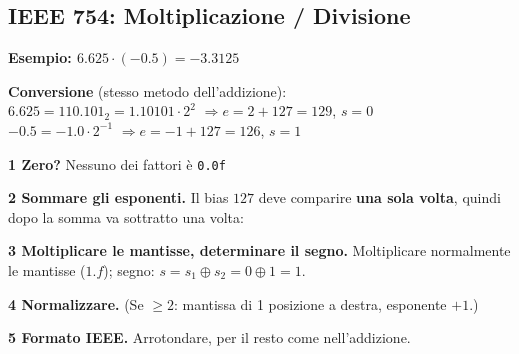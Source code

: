 \subsection{IEEE 754: Moltiplicazione / Divisione}

\noindent\textbf{Esempio: $6.625 \cdot (-0.5) = -3.3125$}
\medskip

\noindent\textbf{Conversione} (stesso metodo dell'addizione):\\
$6.625 = 110.101_2 = 1.10101 \cdot 2^{2}$ \quad $\Rightarrow e = 2+127 = 129$, $s = 0$\\
$-0.5 = -1.0 \cdot 2^{-1}$ \quad $\Rightarrow e = -1+127 = 126$, $s = 1$
\medskip

\noindent\textbf{1 Zero?} Nessuno dei fattori è \texttt{0.0f} \checkmark
\medskip

\noindent\textbf{2 Sommare gli esponenti.} Il bias $127$ deve comparire \textbf{una sola volta}, quindi dopo la somma va sottratto una volta:
\smallskip

\medskip

\noindent\textbf{3 Moltiplicare le mantisse, determinare il segno.} Moltiplicare normalmente le mantisse ($1.f$); segno: $s = s_1 \oplus s_2 = 0 \oplus 1 = 1$.
\smallskip

\medskip

\noindent\textbf{4 Normalizzare.} (Se $\ge 2$: mantissa di 1 posizione a destra, esponente $+1$.)
\medskip

\noindent\textbf{5 Formato IEEE.} Arrotondare, per il resto come nell'addizione.
\smallskip

\medskip